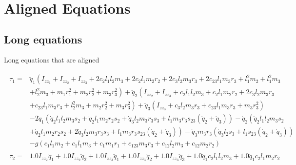 \section{Aligned Equations}

\subsection{Long equations}

Long equations that are aligned

\begin{align}
    \begin{split}
        \tau_1 =& \ddot{q}_1 \left(I_{zz_1} + I_{zz_2} + I_{zz_3} + 2 c_{2} l_{1} l_{2} m_{3} + 2 c_{2} l_{1} m_{2} r_{2} + 2 c_{3} l_{2} m_{3} r_{3} + 2 c_{23} l_{1} m_{3} r_{3} + l_{1}^{2} m_{2} + l_{1}^{2} m_{3} \right.\\
            & \left. + l_{2}^{2} m_{3} + m_{1} r_{1}^{2} + m_{2} r_{2}^{2} + m_{3} r_{3}^{2}\right) + \ddot{q}_2 \left(I_{zz_2} + I_{zz_3} + c_{2} l_{1} l_{2} m_{3} + c_{2} l_{1} m_{2} r_{2} + 2 c_{3} l_{2} m_{3} r_{3} \right. \\
            & \left. + c_{23} l_{1} m_{3} r_{3} + l_{2}^{2} m_{3} + m_{2} r_{2}^{2} + m_{3} r_{3}^{2}\right) + \ddot{q}_3 \left(I_{zz_3} + c_{3} l_{2} m_{3} r_{3} + c_{23} l_{1} m_{3} r_{3} + m_{3} r_{3}^{2}\right) \\
            & - 2 \dot{q}_1 \left(\dot{q}_2 l_{1} l_{2} m_{3} s_{2} + \dot{q}_2 l_{1} m_{2} r_{2} s_{2} + \dot{q}_3 l_{2} m_{3} r_{3} s_{3} + l_{1} m_{3} r_{3} s_{23} \left(\dot{q}_2 + \dot{q}_3\right)\right) - \dot{q}_2 \left(\dot{q}_2 l_{1} l_{2} m_{3} s_{2} \right. \\
            & \left. + \dot{q}_2 l_{1} m_{2} r_{2} s_{2} + 2 \dot{q}_3 l_{2} m_{3} r_{3} s_{3} + l_{1} m_{3} r_{3} s_{23} \left(\dot{q}_2 + \dot{q}_3\right)\right) - \dot{q}_3 m_{3} r_{3} \left(\dot{q}_3 l_{2} s_{3} + l_{1} s_{23} \left(\dot{q}_2 + \dot{q}_3\right)\right) \\
            & - g \left(c_{1} l_{1} m_{2} + c_{1} l_{1} m_{3} + c_{1} m_{1} r_{1} + c_{123} m_{3} r_{3} + c_{12} l_{2} m_{3} + c_{12} m_{2} r_{2}\right)
    \end{split}
    \label{eq:3r-dyn-tau-vect-elem1}
    \\
    \begin{split}
        \tau_2 =& 1.0 I_{zz_2} \ddot{q}_1 + 1.0 I_{zz_2} \ddot{q}_2 + 1.0 I_{zz_3} \ddot{q}_1 + 1.0 I_{zz_3} \ddot{q}_2 + 1.0 I_{zz_3} \ddot{q}_3 + 1.0 \ddot{q}_1 c_{2} l_{1} l_{2} m_{3} + 1.0 \ddot{q}_1 c_{2} l_{1} m_{2} r_{2} \\

\end{split}
\end{align}

